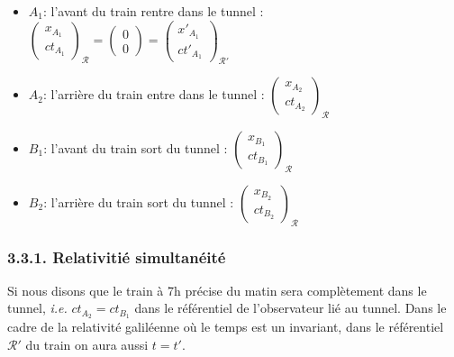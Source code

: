 \documentclass[french, a4paper, 10pt, twocolumn, landscape]{article}
\begin{document}
\begin{itemize}
	\item $A_1$: l'avant du train rentre dans le tunnel : $\begin{pmatrix}
		x_{A_1}\\
		ct_{A_1}
	\end{pmatrix}_{\mathcal{R}} = \begin{pmatrix}
		0\\
		0
	\end{pmatrix}=\begin{pmatrix}
		x'_{A_1}\\
		ct'_{A_1}
	\end{pmatrix}_{\mathcal{R}'} $

	\item $A_2$: l'arrière du train entre dans le tunnel : $\begin{pmatrix}
		x_{A_2}\\
		ct_{A_2}
	\end{pmatrix}_{\mathcal{R}}$

	\item $B_1$: l'avant du train sort du tunnel : $\begin{pmatrix}
		x_{B_1}\\
		ct_{B_1}
	\end{pmatrix}_{\mathcal{R}}$

	\item $B_2$: l'arrière du train sort du tunnel : $\begin{pmatrix}
		x_{B_2}\\
		ct_{B_2}
	\end{pmatrix}_{\mathcal{R}} $
\end{itemize}


\subsubsection*{3.3.1. Relativitié simultanéité}

Si nous disons que le train à 7h précise du matin sera complètement dans le tunnel, \textit{i.e.} $ct_{A_2}=ct_{B_1}$ dans le référentiel de l'observateur lié au tunnel. Dans le cadre de la relativité galiléenne où le temps est un invariant, dans le référentiel $\mathcal{R}'$ du train on aura aussi $t = t'$.
\end{document}
